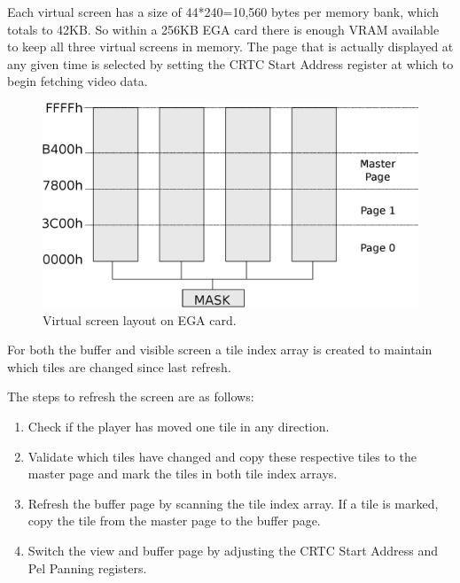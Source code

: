 \documentclass[book.tex]{subfiles}
\begin{document}
\par
Each virtual screen has a size of 44*240=10,560 bytes per memory bank, which totals to 42KB. So within a 256KB EGA card there is enough VRAM available to keep all three virtual screens in memory. The page that is actually displayed at any given time is selected by setting the CRTC Start Address register at which to begin fetching video data.\\



\begin{figure}[H]
\centering
\includegraphics[width=\textwidth]{imgs/drawings/ega_ram_architecture.eps}
\caption{Virtual screen layout on EGA card.}
\label{fig:ega_ram_arch}
\end{figure}

\par
For both the buffer and visible screen a tile index array is created to maintain which tiles are changed since last refresh. \\

\par
\begin{minipage}{\textwidth}
  
  \end{minipage}
  \label{ega_refresh}
  \par

The steps to refresh the screen are as follows:
\begin{enumerate}
\item Check if the player has moved one tile in any direction.
\item Validate which tiles have changed and copy these respective tiles to the master page and mark the tiles in both tile index arrays. 
\item Refresh the buffer page by scanning the tile index array. If a tile is marked, copy the tile from the master page to the buffer page.
\item Switch the view and buffer page by adjusting the CRTC Start Address and Pel Panning registers.
\end{enumerate}
\end{document}
